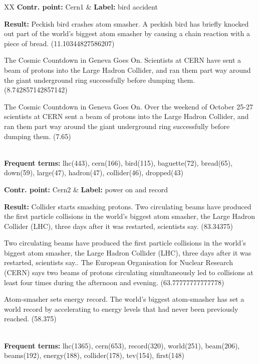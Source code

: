 
\begin{table*}[htbp]
	\centering
	\begin{tabularx}{\textwidth}{XX}
\hline
\textbf{Contr. point:} Cern1 & \textbf{Label:} bird accident\\
	{\textbf{Result:} Peckish bird crashes atom smasher. A peckish bird has
	briefly knocked out part of the world's biggest atom smasher by causing a
	chain reaction with a piece of bread. (11.10344827586207) 

The Cosmic Countdown in Geneva Goes On. Scientists at CERN have sent a beam of
protons into the Large Hadron Collider, and ran them part way around the giant
underground ring successfully before dumping them. (8.742857142857142) 

The Cosmic Countdown in Geneva Goes On. Over the weekend of October 25-27
scientists at CERN sent a beam of protons into the Large Hadron Collider, and
ran them part way around the giant underground ring successfully before dumping
them. (7.65) } \\
{\textbf{Frequent terms:} lhc(443), cern(166), bird(115), baguette(72),
bread(65), down(59), large(47), hadron(47), collider(46), dropped(43)}\\
\hline

\textbf{Contr. point:} Cern2 & \textbf{Label:} power on and record \\
{\textbf{Result:}  
Collider starts smashing protons. Two circulating beams have produced the first
particle collisions in the world's biggest atom smasher, the Large Hadron
Collider (LHC), three days after it was restarted, scientists say. (83.34375) 

Two circulating beams have produced the first particle collisions in the world's
biggest atom smasher, the Large Hadron Collider (LHC), three days after it was
restarted, scientists say.. The European Organisation for Nuclear Research
(CERN) says two beams of protons circulating simultaneously led to collisions at
least four times during the afternoon and evening. (63.77777777777778)

Atom-smasher sets energy record. The world's biggest atom-smasher has set a
world record by accelerating to energy levels that had never been previously
reached. (58.375)
} \\
{\textbf{Frequent terms:} lhc(1365), cern(653), record(320), world(251),
beam(206), beams(192), energy(188), collider(178), tev(154), first(148)} \\
\hline


\end{tabularx}
\end{table*}
